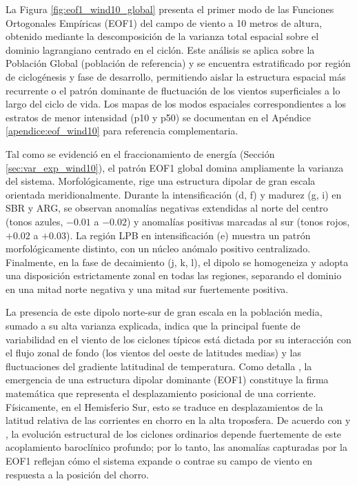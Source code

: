 La Figura \ref{fig:eof1_wind10_global} presenta el primer modo de las Funciones Ortogonales Empíricas (EOF1) del campo de viento a 10 metros de altura, obtenido mediante la descomposición de la varianza total espacial sobre el dominio lagrangiano centrado en el ciclón. Este análisis se aplica sobre la Población Global (población de referencia) y se encuentra estratificado por región de ciclogénesis y fase de desarrollo, permitiendo aislar la estructura espacial más recurrente o el patrón dominante de fluctuación de los vientos superficiales a lo largo del ciclo de vida. Los mapas de los modos espaciales correspondientes a los estratos de menor intensidad (p10 y p50) se documentan en el Apéndice \ref{apendice:eof_wind10} para referencia complementaria.

Tal como se evidenció en el fraccionamiento de energía (Sección \ref{sec:var_exp_wind10}), el patrón EOF1 global domina ampliamente la varianza del sistema. Morfológicamente, rige una estructura dipolar de gran escala orientada meridionalmente. Durante la intensificación (d, f) y madurez (g, i) en SBR y ARG, se observan anomalías negativas extendidas al norte del centro (tonos azules, $-0.01$ a $-0.02$) y anomalías positivas marcadas al sur (tonos rojos, $+0.02$ a $+0.03$). La región LPB en intensificación (e) muestra un patrón morfológicamente distinto, con un núcleo anómalo positivo centralizado. Finalmente, en la fase de decaimiento (j, k, l), el dipolo se homogeneiza y adopta una disposición estrictamente zonal en todas las regiones, separando el dominio en una mitad norte negativa y una mitad sur fuertemente positiva.

La presencia de este dipolo norte-sur de gran escala en la población media, sumado a su alta varianza explicada, indica que la principal fuente de variabilidad en el viento de los ciclones típicos está dictada por su interacción con el flujo zonal de fondo (los vientos del oeste de latitudes medias) y las fluctuaciones del gradiente latitudinal de temperatura. Como detalla \citet{hannachi2007empirical}, la emergencia de una estructura dipolar dominante (EOF1) constituye la firma matemática que representa el desplazamiento posicional de una corriente. Físicamente, en el Hemisferio Sur, esto se traduce en desplazamientos de la latitud relativa de las corrientes en chorro en la alta troposfera. De acuerdo con \citet{hoskins2005new} y \citet{dossantos2023response}, la evolución estructural de los ciclones ordinarios depende fuertemente de este acoplamiento baroclínico profundo; por lo tanto, las anomalías capturadas por la EOF1 reflejan cómo el sistema expande o contrae su campo de viento en respuesta a la posición del chorro. 

